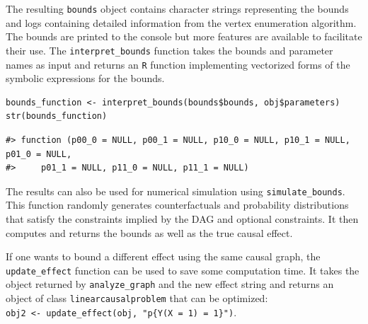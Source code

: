 The resulting \texttt{bounds} object contains character strings representing the bounds and logs containing detailed information from the vertex enumeration algorithm. The bounds are printed to the console but more features are available to facilitate their use. The \texttt{interpret\_bounds} function takes the bounds and parameter names as input and returns an \texttt{R} function implementing vectorized forms of the symbolic expressions for the bounds.

\begin{verbatim}
bounds_function <- interpret_bounds(bounds$bounds, obj$parameters)
str(bounds_function)
\end{verbatim}

\begin{verbatim}
#> function (p00_0 = NULL, p00_1 = NULL, p10_0 = NULL, p10_1 = NULL, p01_0 = NULL, 
#>     p01_1 = NULL, p11_0 = NULL, p11_1 = NULL)
\end{verbatim}

The results can also be used for numerical simulation using \texttt{simulate\_bounds}. This function randomly generates counterfactuals and probability distributions that satisfy the constraints implied by the DAG and optional constraints. It then computes and returns the bounds as well as the true causal effect.

If one wants to bound a different effect using the same causal graph, the \texttt{update\_effect} function can be used to save some computation time. It takes the object returned by \texttt{analyze\_graph} and the new effect string and returns an object of class \texttt{linearcausalproblem} that can be optimized:\\
\texttt{obj2\ \textless{}-\ update\_effect(obj,\ "p\{Y(X\ =\ 1)\ =\ 1\}")}.

